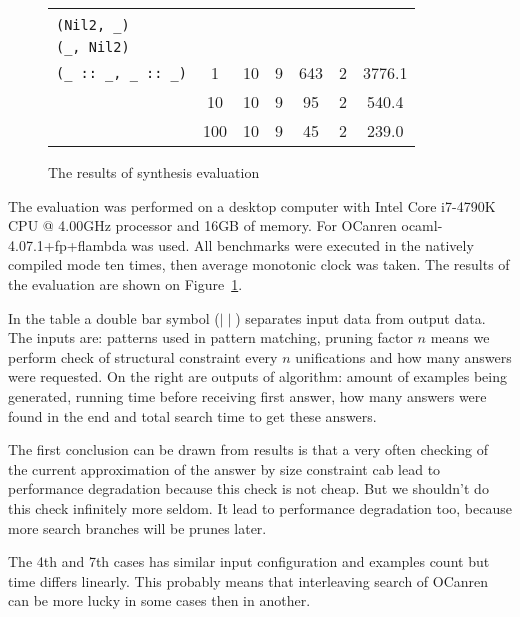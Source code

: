 \begin{figure}[t]
\begin{tabular}{m{3cm}|cc||cccc}
{{\lstinline[basicstyle=\scriptsize]|(_, Nil)|\\[-1mm]
\lstinline[basicstyle=\scriptsize]|(Nil2, _)|\\[-1mm]
\lstinline[basicstyle=\scriptsize]|(_, Nil2)|\\[-1mm]
\lstinline[basicstyle=\scriptsize]|(_ :: _, _ :: _)|}}
         & 1&10&9&643&2&3776.1\\[3mm]
        \cline{2-7}
      &10&10&9&95&2&540.4\\[3mm]
        \cline{2-7}
     &100&10&9&45&2&239.0                         
  \end{tabular}
  \caption{The results of synthesis evaluation}
  \label{fig:eval}
\begin{comment}
\csvreader[tabular=|r|p{3cm}|p{1cm}|p{1.5cm}||p{1.5cm}|p{1.5cm}|p{1.2cm}|p{1.5cm}|,
table head=\hline & Name & Prunes & Answers requested &Example generated&  1st answer time & Answers found & Total search time \\ \hline\hline,
late after line=\\\hline]%
{bench.csv}{}%
{\thecsvrow & \csvcoli & \csvcolii & \csvcoliii & \csvcoliv & \csvcolv & \csvcolvi& \csvcolvii }
\caption{Benchmarks. Input data is on the left side of double dash $\mid\mid$ and result are on the right}
\label{fig:bench} 
\end{comment}
\end{figure}


The evaluation was performed on a desktop computer with Intel Core i7-4790K CPU @ 4.00GHz processor and 16GB of memory.
For OCanren \mbox{ocaml-4.07.1+fp+flambda} was used.
All benchmarks were executed in the natively compiled mode ten times, then average monotonic clock was taken. The results of the evaluation
are shown on Figure~\ref{fig:eval}.

In the table a double bar symbol ($\mid\mid$) separates input data from output data. The inputs are: patterns used in pattern matching, pruning factor $n$ means we perform check of structural constraint every $n$ unifications and how many answers were requested. On the right are outputs of algorithm: amount of examples being generated, running time before receiving first answer, how many answers were found in the end and total search time to get these answers.

The first conclusion can be drawn from results is that a very often checking
of the current approximation of the answer by size constraint
cab lead to performance degradation
because this check is not cheap. But we shouldn't do this check infinitely more seldom. It lead to performance degradation too,
because more search branches will be prunes later.

The 4th and 7th cases has similar input configuration and examples count but time differs linearly. This probably means that interleaving search of OCanren can be more lucky in some cases then in another.
